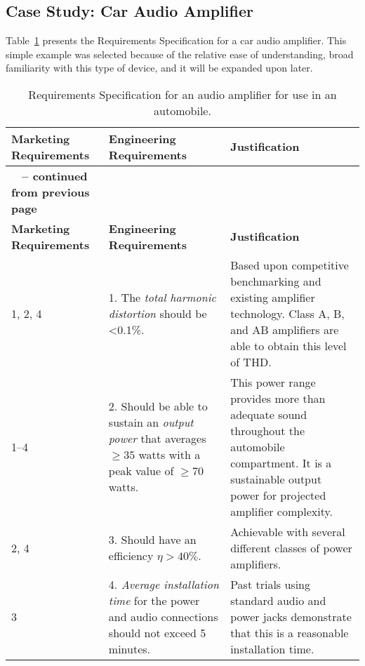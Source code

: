 \subsection{Case Study: Car Audio Amplifier}
\label{subsection:case-study-car-audio-amplifier}

Table~\ref{table:audioRequireSpec} presents the Requirements Specification for a car audio
amplifier. This simple example was selected because of the relative ease
of understanding, broad familiarity with this type of device, and it
will be expanded upon later.

\begin{longtable}{ |p{2.5cm}|p{5cm}|p{5cm}|} 
\caption{Requirements Specification for an audio amplifier for use in an automobile.}
\label{table:audioRequireSpec} \\

\hline
\rowcolor{Gray}
\textbf{Marketing Requirements} & \textbf{Engineering Requirements} & \textbf{Justification} \\ \hline
\endfirsthead

\hline
\rowcolor{Gray}
\multicolumn{3}{|c|}
{{\bfseries \tablename\ \thetable{} -- continued from previous page}} \\ \hline
\rowcolor{Gray}
\textbf{Marketing Requirements} & \textbf{Engineering Requirements} & \textbf{Justification} \\ \hline
\endhead
\endfoot
                           
1, 2, 4 &
1.  The \emph{total harmonic distortion} should be \textless0.1\%. &
Based upon competitive benchmarking and existing
amplifier technology. Class A, B, and AB amplifiers are able to obtain
this level of THD. \\ \hline

1--4 & 
2.   Should be able to sustain an \emph{output power} that averages $\ge 35$
  watts with a peak value of $\ge 70$ watts. & 
This power range provides more than adequate sound
throughout the automobile compartment. It is a sustainable output power
for projected amplifier complexity. \\ \hline

2, 4 & 
3. Should have an efficiency $\eta > 40\%$. &
Achievable with several different classes of power amplifiers. \\ \hline

3 & 
4.   \emph{Average installation time} for the power and audio connections
  should not exceed 5 minutes. &
Past trials using standard audio and power jacks
demonstrate that this is a reasonable installation time. \\ \hline


\end{longtable}
